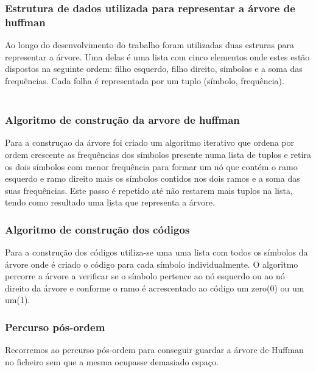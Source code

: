 \subsubsection{Estrutura de dados utilizada para representar a árvore de huffman}

Ao longo do desenvolvimento do trabalho foram utilizadas duas estruras para representar a árvore. Uma delas é uma lista com cinco elementos onde estes estão dispostos na seguinte ordem: filho esquerdo, filho direito, símbolos e a soma das frequências. Cada folha é representada por um tuplo (símbolo, frequência).
\\
\\
\subsubsection{Algoritmo de construção da arvore de huffman}

Para a construçao da árvore foi criado um algoritmo iterativo que ordena por ordem crescente as frequências dos símbolos presente numa lista de tuplos e retira os dois símbolos com menor frequência para formar um nó que contém o ramo esquerdo e ramo direito mais os símbolos contidos nos dois ramos e a soma das suas frequências. Este passo é repetido até não restarem mais tuplos na lista, tendo como resultado uma lista que representa a árvore.

\subsubsection{Algoritmo de construção dos códigos}

Para a construção dos códigos utiliza-se uma uma lista com todos os símbolos da árvore onde é criado o código para cada símbolo individualmente. O algoritmo percorre a árvore a verificar se o símbolo pertence ao nó esquerdo ou ao nó direito da árvore e conforme o ramo é acrescentado ao código um zero(0) ou um um(1).

\newpage

\subsubsection{Percurso pós-ordem}
\FloatBarrier
Recorremos ao percurso pós-ordem para conseguir guardar a árvore de Huffman no ficheiro sem que a mesma ocupasse demasiado espaço.\\

